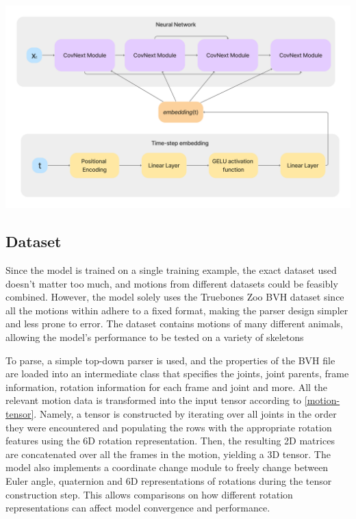 \documentclass[a4paper, 12pt]{report}
\begin{document}
\includegraphics[width=\textwidth]{network_architecture.png}

\subsection{Dataset}

Since the model is trained on a single training example, the exact dataset used doesn't matter too much, and motions from different datasets could be feasibly combined. However, the model solely uses the Truebones Zoo BVH dataset \cite{truebones_free_2020} since all the motions within adhere to a fixed format, making the parser design simpler and less prone to error. The dataset contains motions of many different animals, allowing the model's performance to be tested on a variety of skeletons 

To parse, a simple top-down parser is used, and the properties of the BVH file are loaded into an intermediate class that specifies the joints, joint parents, frame information, rotation information for each frame and joint and more. All the relevant motion data is transformed into the input tensor according to \ref{motion-tensor}. Namely, a tensor is constructed by iterating over all joints in the order they were encountered and populating the rows with the appropriate rotation features using the 6D rotation representation. Then, the resulting 2D matrices are concatenated over all the frames in the motion, yielding a 3D tensor. The model also implements a coordinate change module to freely change between Euler angle, quaternion and 6D representations of rotations during the tensor construction step. This allows comparisons on how different rotation representations can affect model convergence and performance. 
\end{document}
